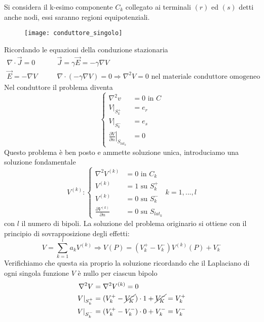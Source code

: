 Si considera il k-esimo componente $C_k$ collegato ai terminali $(r)$ ed $(s)$
detti anche nodi, essi saranno regioni equipotenziali.
\begin{figure}[H]
\centering
\texttt{[image: conduttore\_singolo]}
\end{figure}
Ricordando le equazioni della conduzione stazionaria
$$
\begin{aligned}
\nabla\cdot\vec{J} = 0 & \qquad \vec{J} = \gamma \vec{E} = -\gamma\nabla V\\
\vec{E} = -\nabla V & \qquad \nabla\cdot\left(-\gamma\nabla V\right) = 0 \Rightarrow \nabla^2 V = 0 \text{ nel materiale conduttore omogeneo}
\end{aligned}
$$
Nel conduttore il problema diventa
$$
\begin{cases}
\nabla^2 v &= 0  \text{ in } C\\
\left.V\right|_{S_k^+} &= e_r\\
\left.V\right|_{S_k^-} &= e_s\\
\left.\frac{\partial V}{\partial n}\right|_{S_{lat_k}} &= 0
\end{cases}
$$
Questo problema è ben posto e ammette soluzione unica, introduciamo una soluzione 
fondamentale 
$$
V^{(k)}: \begin{cases}
\nabla^2 V^{(k)} &= 0 \text{ in } C_k\\
V^(k) &= 1 \text{ su } S_k^+ \\
V^(k) &= 0 \text{ su } S_k^- \\
\frac{\partial V^{(k)}}{\partial n} &= 0 \text{ su } S_{lat_k}
\end{cases}
k = 1,...,l
$$
con $l$ il numero di bipoli. La soluzione del problema originario si ottiene con il
principio di sovrapposizione degli effetti:
$$
V = \sum_{k=1}^l a_kV^{(k)} \Rightarrow V(P) = (V_k^+ - V_k^-)V^{(k)}(P) + V_k^-
$$
Verifichiamo che questa sia proprio la soluzione ricordando che il Laplaciano 
di ogni singola funzione $V$ è nullo per ciascun bipolo
$$
\begin{aligned}
\nabla^2 V &= \nabla^2 V^{(k)} = 0\\
V|_{S_k^+} &= (V_k^+ - \cancel{V_K^-})\cdot 1 + \cancel{V_K^-} = V_k^+ \\
V|_{S_k^-} &= (V_k^+ - V_k^-)\cdot 0 + V_k^- = V_k^-
\end{aligned}
$$

